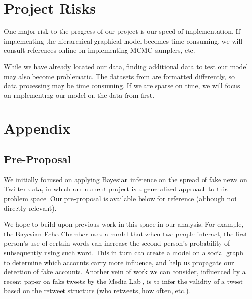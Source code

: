\documentclass[runningheads]{article}
\begin{document}
\section{Project Risks}

One major risk to the progress of our project is our speed of implementation. If implementing the hierarchical graphical model becomes time-consuming, we will consult references online on implementing MCMC samplers, etc.

While we have already located our data, finding additional data to test our model may also become problematic. The datasets from \cite{medialab, popularity} are formatted differently, so data processing may be time consuming. If we are sparse on time, we will focus on implementing our model on the data from \cite{popularity} first.

\nocite{*}



\section*{Appendix}

\subsection*{Pre-Proposal}

We initially focused on applying Bayesian inference on the spread of fake news on Twitter data, in which our current project is a generalized approach to this problem space. Our pre-proposal is available below for reference (although not directly relevant).

We hope to build upon previous work in this space in our analysis. For example, the Bayesian Echo Chamber \cite{bayes_echo} uses a model that when two people interact, the first person's use of certain words can increase the second person’s probability of subsequently using such word. This in turn can create a model on a social graph to determine which accounts carry more influence, and help us propagate our detection of fake accounts. Another vein of work we can consider, influenced by a recent paper on fake tweets by the Media Lab \cite{medialab}, is to infer the validity of a tweet based on the retweet structure (who retweets, how often, etc.).
\end{document}
